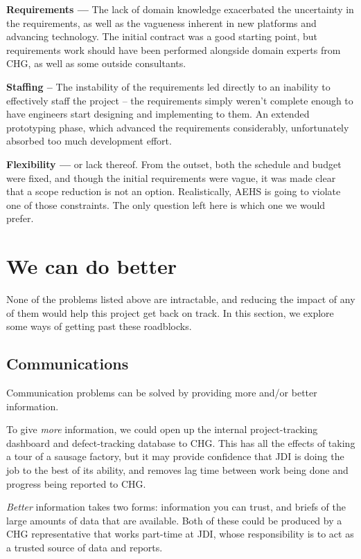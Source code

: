 \documentclass[12pt]{article}
\begin{document}
{\bf Requirements ---} The lack of domain knowledge exacerbated the uncertainty in the requirements,
as well as the vagueness inherent in new platforms and advancing technology.  The initial contract
was a good starting point, but requirements work should have been performed alongside domain experts
from CHG, as well as some outside consultants.

{\bf Staffing --} The instability of the requirements led directly to an inability to effectively
staff the project -- the requirements simply weren't complete enough to have engineers start
designing and implementing to them.  An extended prototyping phase, which advanced the requirements
considerably, unfortunately absorbed too much development effort.

{\bf Flexibility ---} or lack thereof.  From the outset, both the schedule and budget were fixed,
and though the initial requirements were vague, it was made clear that a scope reduction is not an
option.  Realistically, AEHS is going to violate one of those constraints.  The only question left
here is which one we would prefer.

\clearpage


\section{We can do better}

None of the problems listed above are intractable, and reducing the impact of any of them would help
this project get back on track.  In this section, we explore some ways of getting past these
roadblocks.

\subsection{Communications}
Communication problems can be solved by providing more and/or better information.

To give \emph{more} information, we could open up the internal project-tracking dashboard and
defect-tracking database to CHG.  This has all the effects of taking a tour of a sausage factory,
but it may provide confidence that JDI is doing the job to the best of its ability, and removes lag
time between work being done and progress being reported to CHG.

\emph{Better} information takes two forms: information you can trust, and briefs of the large
amounts of data that are available.  Both of these could be produced by a CHG representative that
works part-time at JDI, whose responsibility is to act as a trusted source of data and reports.
\end{document}

